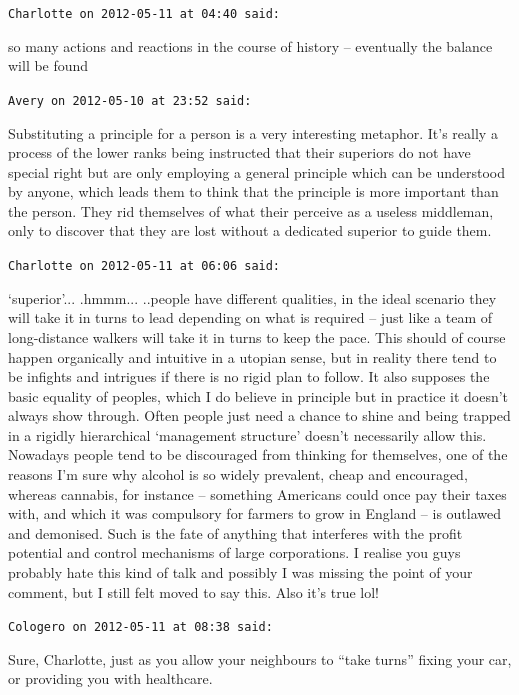\begin{footnotesize}
\begin{sffamily}
\hfill

\texttt{Charlotte on 2012-05-11 at 04:40 said:}

so many actions and reactions in the course of history -- eventually the balance will be found

\hfill

\texttt{Avery on 2012-05-10 at 23:52 said:}

Substituting a principle for a person is a very interesting metaphor. It's really a process of the lower ranks being instructed that their superiors do not have special right but are only employing a general principle which can be understood by anyone, which leads them to think that the principle is more important than the person. They rid themselves of what their perceive as a useless middleman, only to discover that they are lost without a dedicated superior to guide them.

\hfill

\texttt{Charlotte on 2012-05-11 at 06:06 said:}

`superior'... .hmmm... ..people have different qualities, in the ideal scenario they will take it in turns to lead depending on what is required -- just like a team of long-distance walkers will take it in turns to keep the pace. This should of course happen organically and intuitive in a utopian sense, but in reality there tend to be infights and intrigues if there is no rigid plan to follow. It also supposes the basic equality of peoples, which I do believe in principle but in practice it doesn't always show through. Often people just need a chance to shine and being trapped in a rigidly hierarchical `management structure' doesn't necessarily allow this. Nowadays people tend to be discouraged from thinking for themselves, one of the reasons I'm sure why alcohol is so widely prevalent, cheap and encouraged, whereas cannabis, for instance -- something Americans could once pay their taxes with, and which it was compulsory for farmers to grow in England -- is outlawed and demonised. Such is the fate of anything that interferes with the profit potential and control mechanisms of large corporations. I realise you guys probably hate this kind of talk and possibly I was missing the point of your comment, but I still felt moved to say this. Also it's true lol!

\hfill

\texttt{Cologero on 2012-05-11 at 08:38 said:}

Sure, Charlotte, just as you allow your neighbours to ``take turns'' fixing your car, or providing you with healthcare.


\end{sffamily}
\end{footnotesize}
